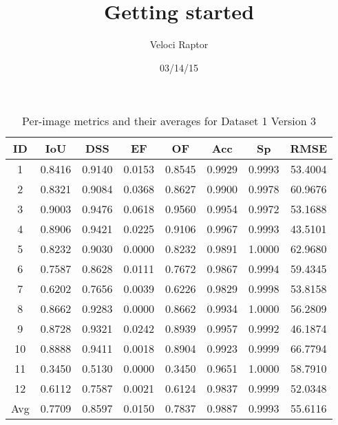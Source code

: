 \documentclass[12pt]{article}
\title{Getting started}
\author{Veloci Raptor}
\date{03/14/15}
\begin{document}
\maketitle


\begin{table}[h]
\centering
\begin{tabular}{|c|c|c|c|c|c|c|c|}
\hline
ID & IoU & DSS & EF & OF & Acc & Sp & RMSE \\
\hline
1 & 0.8416 & 0.9140 & 0.0153 & 0.8545 & 0.9929 & 0.9993 & 53.4004 \\
2 & 0.8321 & 0.9084 & 0.0368 & 0.8627 & 0.9900 & 0.9978 & 60.9676 \\
3 & 0.9003 & 0.9476 & 0.0618 & 0.9560 & 0.9954 & 0.9972 & 53.1688 \\
4 & 0.8906 & 0.9421 & 0.0225 & 0.9106 & 0.9967 & 0.9993 & 43.5101 \\
5 & 0.8232 & 0.9030 & 0.0000 & 0.8232 & 0.9891 & 1.0000 & 62.9680 \\
6 & 0.7587 & 0.8628 & 0.0111 & 0.7672 & 0.9867 & 0.9994 & 59.4345 \\
7 & 0.6202 & 0.7656 & 0.0039 & 0.6226 & 0.9829 & 0.9998 & 53.8158 \\
8 & 0.8662 & 0.9283 & 0.0000 & 0.8662 & 0.9934 & 1.0000 & 56.2809 \\
9 & 0.8728 & 0.9321 & 0.0242 & 0.8939 & 0.9957 & 0.9992 & 46.1874 \\
10 & 0.8888 & 0.9411 & 0.0018 & 0.8904 & 0.9923 & 0.9999 & 66.7794 \\
11 & 0.3450 & 0.5130 & 0.0000 & 0.3450 & 0.9651 & 1.0000 & 58.7910 \\
12 & 0.6112 & 0.7587 & 0.0021 & 0.6124 & 0.9837 & 0.9999 & 52.0348 \\
\hline
Avg & 0.7709 & 0.8597 & 0.0150 & 0.7837 & 0.9887 & 0.9993 & 55.6116 \\
\hline
\end{tabular}
\caption{Per-image metrics and their averages for Dataset 1 Version 3}
\end{table}
\end{document}
